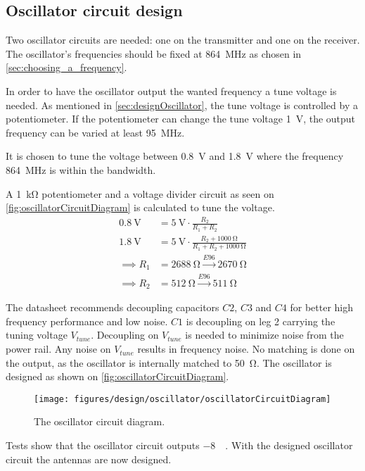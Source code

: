 \subsection{Oscillator circuit design}\label{sec:oscillatorDesign}
Two oscillator circuits are needed: one on the transmitter and one on the receiver. The oscillator's frequencies should be fixed at \SI{864}{\mega\hertz} as chosen in \autoref{sec:choosing_a_frequency}. 

In order to have the oscillator output the wanted frequency a tune voltage is needed. As mentioned in \autoref{sec:designOscillator}, the tune voltage is controlled by a potentiometer. If the potentiometer can change the tune voltage \SI{1}{\volt}, the output frequency can be varied at least \SI{95}{\mega\hertz}.  

It is chosen to tune the voltage between \SI{0.8}{\volt} and \SI{1.8}{\volt} where the frequency \SI{864}{\mega\hertz} is within the bandwidth. 

A \SI{1}{\kilo\ohm} potentiometer and a voltage divider circuit as seen on \autoref{fig:oscillatorCircuitDiagram} is calculated to tune the voltage. 
\begin{subequations}
\begin{align} 
\SI{0.8}{\volt} &= \SI{5}{\volt} \cdot \frac{R_2}{R_1 + R_2} \\
\SI{1.8}{\volt} &= \SI{5}{\volt} \cdot \frac{R_2 + \SI{1000}{\ohm}}{R_1 + R_2 + \SI{1000}{\ohm}}\\
\implies R_1 &= \SI{2688}{\ohm} \xrightarrow{E96} \SI{2670}{\ohm} \\
\implies R_2 &= \SI{512}{\ohm} \xrightarrow{E96} \SI{511}{\ohm}
\end{align} \label{eq:osciristor}
\end{subequations}

\newpage
The datasheet \citep{datasheet:MAX2622} recommends decoupling capacitors $C2$, $C3$ and $C4$ for better high frequency performance and low noise. $C1$ is decoupling on leg 2 carrying the tuning voltage $V_{tune}$. Decoupling on $V_{tune}$ is needed to minimize noise from the power rail. Any noise on $V_{tune}$ results in frequency noise. No matching is done on the output, as the oscillator is internally matched to \SI{50}{\ohm}. The oscillator is designed as shown on \autoref{fig:oscillatorCircuitDiagram}. 
\begin{figure}[h!]
    \centering
        \texttt{[image: figures/design/oscillator/oscillatorCircuitDiagram]}
        \caption{The oscillator circuit diagram.}
        \label{fig:oscillatorCircuitDiagram}
\end{figure}

Tests show that the oscillator circuit outputs \SI{-8}{\deci\belm}. With the designed oscillator circuit the antennas are now designed. 